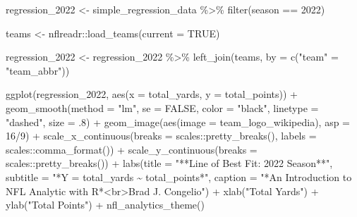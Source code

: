 \documentclass[
  letterpaper,
]{krantz}
\newenvironment{Shaded}{\begin{snugshade}}{\end{snugshade}}
\newcommand{\AttributeTok}[1]{\textcolor[rgb]{0.40,0.45,0.13}{#1}}
\newcommand{\ConstantTok}[1]{\textcolor[rgb]{0.56,0.35,0.01}{#1}}
\newcommand{\DecValTok}[1]{\textcolor[rgb]{0.68,0.00,0.00}{#1}}
\newcommand{\FunctionTok}[1]{\textcolor[rgb]{0.28,0.35,0.67}{#1}}
\newcommand{\NormalTok}[1]{\textcolor[rgb]{0.00,0.23,0.31}{#1}}
\newcommand{\OtherTok}[1]{\textcolor[rgb]{0.00,0.23,0.31}{#1}}
\newcommand{\SpecialCharTok}[1]{\textcolor[rgb]{0.37,0.37,0.37}{#1}}
\newcommand{\StringTok}[1]{\textcolor[rgb]{0.13,0.47,0.30}{#1}}
\begin{document}
\begin{Shaded}
\begin{Highlighting}[]
\NormalTok{regression\_2022 }\OtherTok{\textless{}{-}}\NormalTok{ simple\_regression\_data }\SpecialCharTok{\%\textgreater{}\%}
  \FunctionTok{filter}\NormalTok{(season }\SpecialCharTok{==} \DecValTok{2022}\NormalTok{)}

\NormalTok{teams }\OtherTok{\textless{}{-}}\NormalTok{ nflreadr}\SpecialCharTok{::}\FunctionTok{load\_teams}\NormalTok{(}\AttributeTok{current =} \ConstantTok{TRUE}\NormalTok{)}

\NormalTok{regression\_2022 }\OtherTok{\textless{}{-}}\NormalTok{ regression\_2022 }\SpecialCharTok{\%\textgreater{}\%}
  \FunctionTok{left\_join}\NormalTok{(teams, }\AttributeTok{by =} \FunctionTok{c}\NormalTok{(}\StringTok{"team"} \OtherTok{=} \StringTok{"team\_abbr"}\NormalTok{))}

  \FunctionTok{ggplot}\NormalTok{(regression\_2022, }\FunctionTok{aes}\NormalTok{(}\AttributeTok{x =}\NormalTok{ total\_yards, }\AttributeTok{y =}\NormalTok{ total\_points)) }\SpecialCharTok{+}
  \FunctionTok{geom\_smooth}\NormalTok{(}\AttributeTok{method =} \StringTok{"lm"}\NormalTok{, }\AttributeTok{se =} \ConstantTok{FALSE}\NormalTok{,}
              \AttributeTok{color =} \StringTok{"black"}\NormalTok{,}
              \AttributeTok{linetype =} \StringTok{"dashed"}\NormalTok{,}
              \AttributeTok{size =}\NormalTok{ .}\DecValTok{8}\NormalTok{) }\SpecialCharTok{+}
  \FunctionTok{geom\_image}\NormalTok{(}\FunctionTok{aes}\NormalTok{(}\AttributeTok{image =}\NormalTok{ team\_logo\_wikipedia), }\AttributeTok{asp =} \DecValTok{16}\SpecialCharTok{/}\DecValTok{9}\NormalTok{) }\SpecialCharTok{+}
  \FunctionTok{scale\_x\_continuous}\NormalTok{(}\AttributeTok{breaks =}\NormalTok{ scales}\SpecialCharTok{::}\FunctionTok{pretty\_breaks}\NormalTok{(),}
                     \AttributeTok{labels =}\NormalTok{ scales}\SpecialCharTok{::}\FunctionTok{comma\_format}\NormalTok{()) }\SpecialCharTok{+}
  \FunctionTok{scale\_y\_continuous}\NormalTok{(}\AttributeTok{breaks =}\NormalTok{ scales}\SpecialCharTok{::}\FunctionTok{pretty\_breaks}\NormalTok{()) }\SpecialCharTok{+}
  \FunctionTok{labs}\NormalTok{(}\AttributeTok{title =} \StringTok{"**Line of Best Fit: 2022 Season**"}\NormalTok{,}
       \AttributeTok{subtitle =} \StringTok{"*Y = total\_yards \textasciitilde{} total\_points*"}\NormalTok{,}
       \AttributeTok{caption =} \StringTok{"*An Introduction to NFL Analytic with R*\textless{}br\textgreater{}Brad J. Congelio"}\NormalTok{) }\SpecialCharTok{+}
  \FunctionTok{xlab}\NormalTok{(}\StringTok{"Total Yards"}\NormalTok{) }\SpecialCharTok{+}
  \FunctionTok{ylab}\NormalTok{(}\StringTok{"Total Points"}\NormalTok{) }\SpecialCharTok{+}
  \FunctionTok{nfl\_analytics\_theme}\NormalTok{()}
\end{Highlighting}
\end{Shaded}
\end{document}
